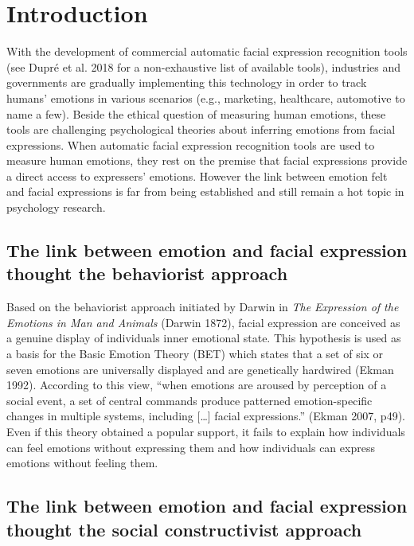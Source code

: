 \documentclass[conference,final,]{IEEEtran}
\begin{document}
\hypertarget{introduction}{%
\section{Introduction}\label{introduction}}

With the development of commercial automatic facial expression
recognition tools (see Dupré et al. 2018 for a non-exhaustive list of
available tools), industries and governments are gradually implementing
this technology in order to track humans' emotions in various scenarios
(e.g., marketing, healthcare, automotive to name a few). Beside the
ethical question of measuring human emotions, these tools are
challenging psychological theories about inferring emotions from facial
expressions. When automatic facial expression recognition tools are used
to measure human emotions, they rest on the premise that facial
expressions provide a direct access to expressers' emotions. However the
link between emotion felt and facial expressions is far from being
established and still remain a hot topic in psychology research.

\hypertarget{the-link-between-emotion-and-facial-expression-thought-the-behaviorist-approach}{%
\subsection{The link between emotion and facial expression thought the
behaviorist
approach}\label{the-link-between-emotion-and-facial-expression-thought-the-behaviorist-approach}}

Based on the behaviorist approach initiated by Darwin in \emph{The
Expression of the Emotions in Man and Animals} (Darwin 1872), facial
expression are conceived as a genuine display of individuals inner
emotional state. This hypothesis is used as a basis for the Basic
Emotion Theory (BET) which states that a set of six or seven emotions
are universally displayed and are genetically hardwired (Ekman 1992).
According to this view, ``when emotions are aroused by perception of a
social event, a set of central commands produce patterned
emotion-specific changes in multiple systems, including {[}\ldots{}{]}
facial expressions.'' (Ekman 2007, p49). Even if this theory obtained a
popular support, it fails to explain how individuals can feel emotions
without expressing them and how individuals can express emotions without
feeling them.

\hypertarget{the-link-between-emotion-and-facial-expression-thought-the-social-constructivist-approach}{%
\subsection{The link between emotion and facial expression thought the
social constructivist
approach}\label{the-link-between-emotion-and-facial-expression-thought-the-social-constructivist-approach}}
\end{document}

